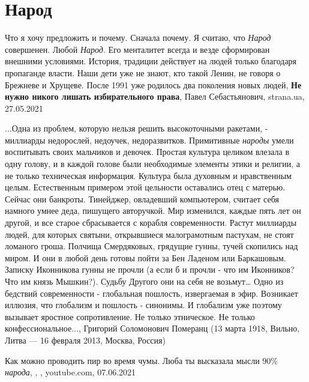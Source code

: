  
 
 
 
 
\chapter{Народ}

Что я хочу предложить и почему. Сначала почему. Я считаю, что \emph{Народ}
совершенен. Любой \emph{Народ}. Его менталитет всегда и везде сформирован
внешними условиями. История, традиции действует на людей только благодаря
пропаганде власти. Наши дети уже не знают, кто такой Ленин, не говоря о
Брежневе и Хрущеве. После 1991 уже родилось два поколения новых людей,
\textbf{Не нужно никого лишать избирательного права}, Павел Себастьянович,
strana.ua, 27.05.2021

...Одна из проблем, которую нельзя решить высокоточными ракетами, - миллиарды
недорослей, недоучек, недоразвитков. Примитивные \emph{народы} умели
воспитывать своих мальчиков и девочек. Простая культура целиком влезала в одну
голову, и в каждой голове были необходимые элементы этики и религии, а не
только техническая информация. Культура была духовным и нравственным целым.
Естественным примером этой цельности оставались отец с матерью. Сейчас они
банкроты. Тинейджер, овладевший компьютером, считает себя намного умнее деда,
пишущего авторучкой.  Мир изменился, каждые пять лет он другой, и все старое
сбрасывается с корабля современности. Растут миллиарды людей, для которых
святыни, открывшиеся малограмотным пастухам, не стоят ломаного гроша. Полчища
Смердяковых, грядущие гунны, тучей скопились над миром. И они в любой день
готовы пойти за Бен Ладеном или Баркашовым. Записку Иконникова гунны не прочли
(а если б и прочли - что им Иконников? Что им князь Мышкин?). Судьбу Другого
они на себя не возьмут… Одно из бедствий современности - глобальная пошлость,
извергаемая в эфир.  Возникает иллюзия, что глобализм и пошлость - синонимы. И
глобализм уже поэтому вызывает яростное сопротивление. Не только этническое. Не
только конфессиональное...,
Григорий Соломонович Померанц (13 марта 1918, Вильно, Литва — 16 февраля 2013, Москва, Россия)

Как можно проводить пир во время чумы. Люба ты высказала мысли 90\% \emph{народа},
, 
,
youtube.com, 07.06.2021

